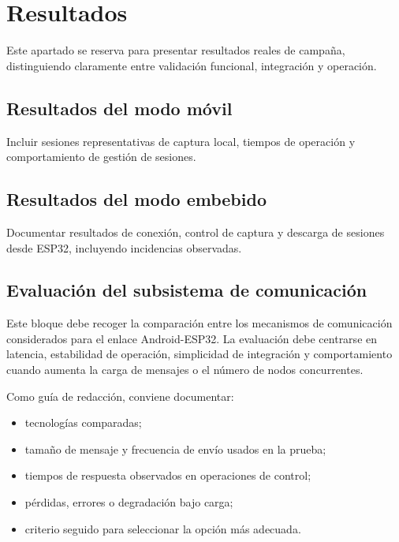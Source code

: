 \section{Resultados}

Este apartado se reserva para presentar resultados reales de campaña, distinguiendo claramente entre validación funcional, integración y operación.

\subsection{Resultados del modo móvil}

Incluir sesiones representativas de captura local, tiempos de operación y comportamiento de gestión de sesiones.

\label{fig:placeholder-resultado-movil}

\subsection{Resultados del modo embebido}

Documentar resultados de conexión, control de captura y descarga de sesiones desde ESP32, incluyendo incidencias observadas.

\label{fig:placeholder-resultado-embebido}

\subsection{Evaluación del subsistema de comunicación}

Este bloque debe recoger la comparación entre los mecanismos de comunicación considerados para el enlace Android-ESP32. La evaluación debe centrarse en latencia, estabilidad de operación, simplicidad de integración y comportamiento cuando aumenta la carga de mensajes o el número de nodos concurrentes.

Como guía de redacción, conviene documentar:

\begin{itemize}
  \item tecnologías comparadas;
  \item tamaño de mensaje y frecuencia de envío usados en la prueba;
  \item tiempos de respuesta observados en operaciones de control;
  \item pérdidas, errores o degradación bajo carga;
  \item criterio seguido para seleccionar la opción más adecuada.
\end{itemize}

